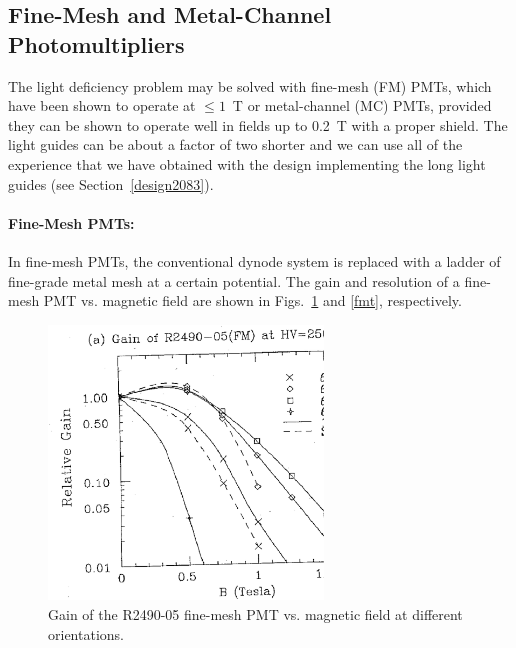 \subsection{Fine-Mesh and Metal-Channel Photomultipliers}
\label{fimemech}

The light deficiency problem may be solved with fine-mesh (FM) PMTs, 
which have been shown to operate at $\leq 1$~T or metal-channel (MC) PMTs,
provided they can be shown to operate well in fields up to 0.2~T with a proper 
shield.  The light guides can be about a factor of two shorter and we can use 
all of the experience that we have obtained with the design implementing the 
long light guides (see Section~\ref{design2083}). 

\paragraph{Fine-Mesh PMTs:}

In fine-mesh PMTs, the conventional dynode system is replaced with a ladder  
of fine-grade metal mesh at a certain potential.  The gain and resolution
\cite{kich} of a fine-mesh PMT vs. magnetic field are shown in 
Figs.~\ref{fmg} and \ref{fmt}, respectively.

\begin{figure}[htbp]
\centering
\includegraphics[width=0.65\textwidth]{fig03MC.ps}
\caption{\small{Gain of the R2490-05 fine-mesh PMT vs. magnetic field at 
different orientations.}} 
\label{fmg}
\end{figure}

